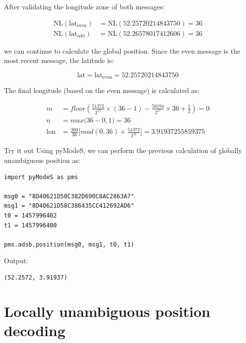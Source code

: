 After validating the longitude zone of both messages:

\begin{equation}
  \begin{split}
    \mathrm{NL}(\mathrm{lat}_\mathrm{even}) &= \mathrm{NL}(52.25720214843750) = 36 \\
    \mathrm{NL}(\mathrm{lat}_\mathrm{odd}) &= \mathrm{NL}(52.26578017412606) = 36
  \end{split}
\end{equation}

we can continue to calculate the global position. Since the even message is the most recent message, the latitude is:

\begin{equation}
  \mathrm{lat} = \mathrm{lat}_\mathrm{even} = 52.25720214843750
\end{equation}

The final longitude (based on the even message) is calculated as:

\begin{align}
  m &= floor \left( \frac{51372}{2^{17}} \times (36-1) - \frac{50194}{2^{17}} \times 36 + \frac{1}{2}  \right) = 0\\
  n &= max \Big( 36-0, 1 \Big) = 36\\
    \mathrm{lon} &= \frac{360}{36} \Big[ mod(0, 36) + \frac{51372}{2^{17}} \Big] = 3.91937255859375
\end{align}

\begin{notebox}{Try it out}
Using pyModeS, we can perform the previous calculation of globally unambiguous position as: 

\begin{verbatim}
import pyModeS as pms

msg0 = "8D40621D58C382D690C8AC2863A7"
msg1 = "8D40621D58C386435CC412692AD6"
t0 = 1457996402
t1 = 1457996400

pms.adsb.position(msg0, msg1, t0, t1)
\end{verbatim}

Output: 

\begin{verbatim}
(52.2572, 3.91937)
\end{verbatim}

\end{notebox}



\section{Locally unambiguous position decoding}

